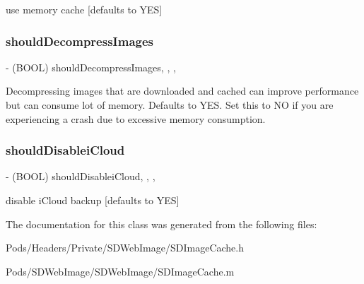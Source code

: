 use memory cache \mbox{[}defaults to Y\+ES\mbox{]} \mbox{\label{interface_s_d_image_cache_ae9994880d8e741fff3221b4ecca61a63}} 
\subsubsection{\texorpdfstring{should\+Decompress\+Images}{shouldDecompressImages}}
{\footnotesize\ttfamily -\/ (B\+O\+OL) should\+Decompress\+Images\hspace{0.3cm}{\ttfamily [read]}, {\ttfamily [write]}, {\ttfamily [nonatomic]}, {\ttfamily [assign]}}

Decompressing images that are downloaded and cached can improve performance but can consume lot of memory. Defaults to Y\+ES. Set this to NO if you are experiencing a crash due to excessive memory consumption. \mbox{\label{interface_s_d_image_cache_a4dab94caee9f8222a1cc03b2c4232b41}} 
\subsubsection{\texorpdfstring{should\+Disablei\+Cloud}{shouldDisableiCloud}}
{\footnotesize\ttfamily -\/ (B\+O\+OL) should\+Disablei\+Cloud\hspace{0.3cm}{\ttfamily [read]}, {\ttfamily [write]}, {\ttfamily [nonatomic]}, {\ttfamily [assign]}}

disable i\+Cloud backup \mbox{[}defaults to Y\+ES\mbox{]} 

The documentation for this class was generated from the following files\+:\begin{DoxyCompactItemize}
\item 
Pods/\+Headers/\+Private/\+S\+D\+Web\+Image/S\+D\+Image\+Cache.\+h\item 
Pods/\+S\+D\+Web\+Image/\+S\+D\+Web\+Image/S\+D\+Image\+Cache.\+m\end{DoxyCompactItemize}
